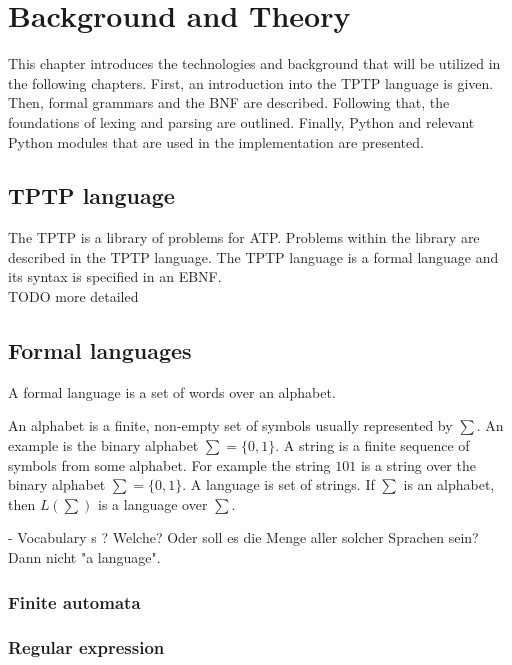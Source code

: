 
\chapter{Background and Theory}\label{cha:Background}

This chapter introduces the technologies and background that will be utilized in the following chapters. First, an introduction into the \ac{TPTP} language is given. Then, formal grammars and the \ac{BNF} are described. Following that, the foundations of lexing and parsing are outlined. Finally, Python and relevant Python modules that are used in the implementation are presented.

\section{TPTP language}\label{sec:BackgroundTPTP}

The \acf{TPTP} is a library of problems for \ac{ATP}.
Problems within the library are described in the \ac{TPTP} language.
The  \ac{TPTP} language is a formal language and its syntax is specified in an \ac{EBNF}. \cite{Sut17}\\

TODO more detailed

\section{Formal languages}\label{sec:BackgroundFormalLanguage}

A formal language is a set of words over an alphabet.

An alphabet is a finite, non-empty set of symbols usually represented by $\sum$. An example is the binary alphabet $\sum = \{0,1\}$.
A string is a finite sequence of symbols from some alphabet. For example the string $101$ is a string over the binary alphabet $\sum = \{0,1\}$.
A language is set of strings. If $\sum$ is an alphabet, then    $L(\sum)$ is a language over $\sum$. \cite{AutomataTheory.2007}

- Vocabulary
s ? Welche? Oder soll es die Menge aller solcher Sprachen sein? Dann nicht "a language".

\subsection{Finite automata}\label{sec:BackgroundAutomata}

\subsection{Regular expression}\label{sec:BackgroundRegEx}

